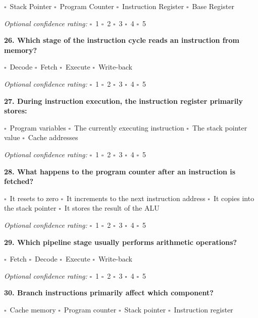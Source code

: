 \documentclass[12pt,a4paper]{article}
\newcommand{\boxmark}{\(\square\)}
\newcommand{\confidenceoptional}{%
    \textit{Optional confidence rating:} \boxmark\ 1 \hspace{1em} \boxmark\ 2 \hspace{1em} \boxmark\ 3 \hspace{1em} \boxmark\ 4 \hspace{1em} \boxmark\ 5
}
\begin{document}
\boxmark\ Stack Pointer \hspace{2em}
\boxmark\ Program Counter \hspace{2em}
\boxmark\ Instruction Register \hspace{2em}
\boxmark\ Base Register

\confidenceoptional

\textbf{26. Which stage of the instruction cycle reads an instruction from memory?}

\boxmark\ Decode \hspace{2em}
\boxmark\ Fetch \hspace{2em}
\boxmark\ Execute \hspace{2em}
\boxmark\ Write-back

\confidenceoptional

\textbf{27. During instruction execution, the instruction register primarily stores:}

\boxmark\ Program variables \hspace{1em}
\boxmark\ The currently executing instruction \hspace{1em}
\boxmark\ The stack pointer value \hspace{1em}
\boxmark\ Cache addresses

\confidenceoptional

\textbf{28. What happens to the program counter after an instruction is fetched?}

\boxmark\ It resets to zero \hspace{1em}
\boxmark\ It increments to the next instruction address \hspace{1em}
\boxmark\ It copies into the stack pointer \hspace{1em}
\boxmark\ It stores the result of the ALU

\confidenceoptional

\textbf{29. Which pipeline stage usually performs arithmetic operations?}

\boxmark\ Fetch \hspace{2em}
\boxmark\ Decode \hspace{2em}
\boxmark\ Execute \hspace{2em}
\boxmark\ Write-back

\confidenceoptional

\textbf{30. Branch instructions primarily affect which component?}

\boxmark\ Cache memory \hspace{1em}
\boxmark\ Program counter \hspace{1em}
\boxmark\ Stack pointer \hspace{1em}
\boxmark\ Instruction register
\end{document}
